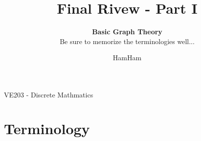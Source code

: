 \documentclass{beamer}
\title{\sffamily Final Rivew -  Part I}
\subtitle{\textbf{Basic Graph Theory}\\Be sure to memorize the terminologies well...}
\institute[UM-SJTU JI]{University of Michigan-Shanghai Jiao Tong University Joint Institute}
\author{HamHam}
\newcommand{\myfont}{\rmfamily\normalsize\upshape\mdseries}
\begin{document}
\begin{titlepage}
    \begin{center}
        VE203 - Discrete Mathmatics 
    \end{center}
\end{titlepage}
\myfont
\newcommand{\binomial}[2]{\begin{pmatrix} {#1}\\{#2}	\end{pmatrix}}
\newcommand{\green}[1]{\textcolor[rgb]{0.3,0.6,0}{#1}}
\newcommand{\tg}[1]{\textbf{\green{{#1}}}}
\section{Terminology}
\end{document}
